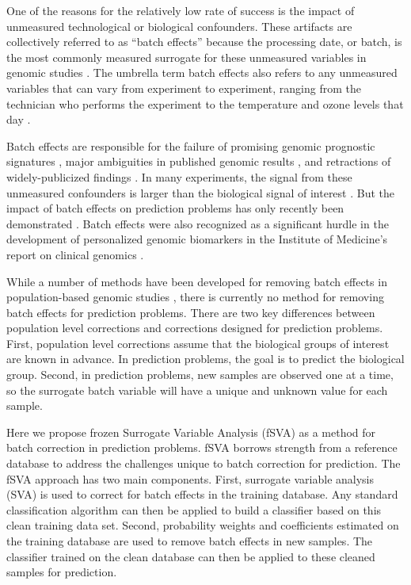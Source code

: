 \documentclass{bioinfo}
\begin{document}
One of the reasons for the relatively low rate of success is the impact of unmeasured technological or biological confounders. These artifacts are collectively referred to as ``batch effects'' because the processing date, or batch, is the most commonly measured surrogate for these unmeasured variables in genomic studies \cite{Scharpf2011,Johnson2007b,Walker2008}. The umbrella term batch effects also refers to any unmeasured variables that can vary from experiment to experiment, ranging from the technician who performs the experiment to the temperature and ozone levels that day \cite{Lander1999,Fare2003}. 

Batch effects are responsible for the failure of promising genomic prognostic signatures \cite{Baggerly2004a,Baggerly2005}, major ambiguities in published genomic results \cite{Spielman2007,Akey2007}, and retractions of widely-publicized findings \cite{Sebastiani2010,Lambert2012}. In many experiments, the signal from these unmeasured confounders is larger than the biological signal of interest \cite{Leek2010}. But the impact of batch effects on prediction problems has only recently been demonstrated \cite{Parker2012,Luo2010}. Batch effects were also recognized as a significant hurdle in the development of personalized genomic biomarkers in the Institute of Medicine's report on clinical genomics \cite{Micheel2012}. 

While a number of methods have been developed for removing batch effects in population-based genomic studies \cite{Johnson2007b,Gagnon-Bartsch2011,Leek2007,Leek2010,Walker2008}, there is currently no method for removing batch effects for prediction problems. There are two key differences between population level corrections and corrections designed for prediction problems. First, population level corrections assume that the biological groups of interest are known in advance. In prediction problems, the goal is to predict the biological group. Second, in prediction problems, new samples are observed one at a time, so the surrogate batch variable will have a unique and unknown value for each sample. 

Here we propose frozen Surrogate Variable Analysis (fSVA) as a method for batch correction in prediction problems. fSVA borrows strength from a reference database to address the challenges unique to batch correction for prediction. The fSVA approach has two main components. First, surrogate variable analysis (SVA) is used to correct for batch effects in the training database. Any standard classification algorithm can then be applied to build a classifier based on this clean training data set. Second, probability weights and coefficients estimated on the training database are used to remove batch effects in new samples. The classifier trained on the clean database can then be applied to these cleaned samples for prediction. 
\end{document}

